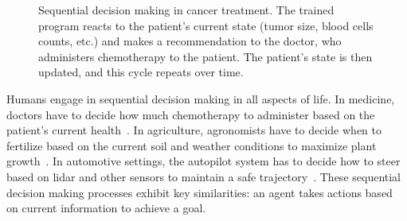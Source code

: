 \begin{figure}
    \caption{Sequential decision making in cancer treatment. The trained program reacts to the patient's current state (tumor size, blood cells counts, etc.) and makes a recommendation to the doctor, who administers chemotherapy to the patient. The patient's state is then updated, and this cycle repeats over time.}
    \label{fig:cancer-treatment-sdm}
\end{figure}
Humans engage in sequential decision making in all aspects of life. In medicine, doctors have to decide how much chemotherapy to administer based on the patient's current health~\cite{cancer}. In agriculture, agronomists have to decide when to fertilize based on the current soil and weather conditions to maximize plant growth~\cite{agriculture}. 
In automotive settings, the autopilot system has to decide how to steer based on lidar and other sensors to maintain a safe trajectory~\cite{driving}. 
These sequential decision making processes exhibit key similarities: an agent takes actions based on current information to achieve a goal.

